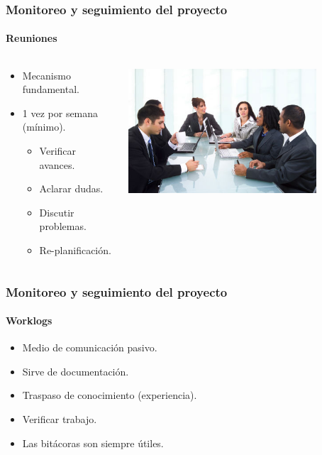 \begin{frame}
\frametitle{Monitoreo y seguimiento del proyecto}
\framesubtitle{Reuniones}

\begin{columns}
	\begin{column}{0.5\textwidth}
		\begin{itemize}
		    \item Mecanismo fundamental.
			\item 1 vez por semana (mínimo).
			\begin{itemize}
				\item Verificar avances.
				\item Aclarar dudas.
				\item Discutir problemas.
				\item Re-planificación.
			\end{itemize}
		\end{itemize}
	\end{column}
	\begin{column}{0.5\textwidth}
		\includegraphics[width=0.8\textwidth]{img/reunion}
	\end{column}
\end{columns}
\end{frame}

\begin{frame}
\frametitle{Monitoreo y seguimiento del proyecto}
\framesubtitle{Worklogs}
\begin{itemize}
    \item Medio de comunicación pasivo.
	\item Sirve de documentación.
	\item Traspaso de conocimiento (experiencia).
	\item Verificar trabajo.
	\item Las bitácoras son siempre útiles.
\end{itemize}
\end{frame}

